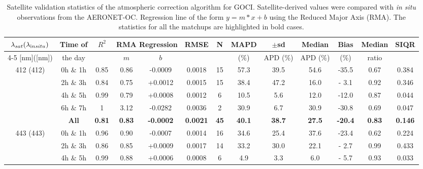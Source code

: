 \documentclass[onecolumn,3p,letterpaper,11pt]{elsarticle}
\begin{document}
\begin{table}[htbp!]
\internallinenumbers
\caption{Satellite validation statistics of the atmospheric correction algorithm for GOCI. Satellite-derived values were compared with {\it in situ} observations from the AERONET-OC. Regression line of the form $y=m*x+b$ using the Reduced Major Axis (RMA). The statistics for all the matchups are highlighted in bold cases. \label{tab:val_stats} }
\tiny
\centering
\begin{tabular}{ccccccccccccc} 
 \hline 
$\lambda_{sat} (\lambda_{\text in situ})$ & Time of & $R^2$ & \multicolumn{2}{c}{RMA Regression} & RMSE & N & MAPD & $\pm$sd & Median & Bias & Median & SIQR \\ \cline{4-5}
[nm]([nm])                  &  the day            &         & $m$     & $b$     &             &     & ($\%$)  & APD ($\%$)  & APD ($\%$)  & ($\%$)   & ratio   &         \\ \hline 
\multirow{5}{*}{412 (412)}  &  0h $\&$ 1h  & 0.85    & 0.86    & -0.0009 & 0.0018      & 15  & 57.3    & 39.5        & 54.6        & -35.5    & 0.67    & 0.384   \\ 
                            &  2h $\&$ 3h  & 0.84    & 0.75    & +0.0012 & 0.0015      & 15  & 38.4    & 47.2        & 16.0        & - 3.1    & 0.92    & 0.346   \\ 
                            &  4h $\&$ 5h  & 0.99    & 0.79    & +0.0008 & 0.0012      & 6   & 10.5    &  5.6        & 12.0        & -12.0    & 0.87    & 0.044   \\ 
                            &  6h $\&$ 7h  & 1       & 3.12    & -0.0282 & 0.0036      & 2   & 30.9    &  6.7        & 30.9        & -30.8    & 0.69    & 0.047   \\ 
                              &  \textbf{All}         & \textbf{0.81}    & \textbf{0.83}    & \textbf{-0.0002} & \textbf{0.0021}      & \textbf{45}  & \textbf{40.1}    & \textbf{38.7}        & \textbf{27.5}        & \textbf{-20.4}    & \textbf{0.83}    & \textbf{0.146}   \\ \hline 
\multirow{5}{*}{443 (443)}  &  0h $\&$ 1h  & 0.96    & 0.90    & -0.0007 & 0.0014      & 16  & 34.6    & 25.4        & 37.6        & -23.4    & 0.62    & 0.224   \\ 
                            &  2h $\&$ 3h  & 0.86    & 0.85    & +0.0009 & 0.0017      & 14  & 33.2    & 30.0        & 22.1        & - 2.7    & 0.99    & 0.433   \\ 
                            &  4h $\&$ 5h  & 0.99    & 0.88    & +0.0006 & 0.0008      & 6   &  4.9    &  3.3        &  6.0        & - 5.7    & 0.93    & 0.033   \\ 

\end{tabular}
\end{table}
\end{document}

